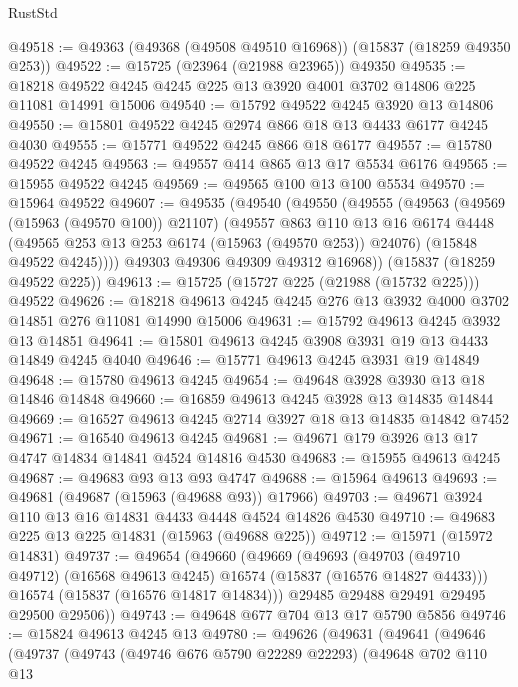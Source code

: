 \begin{lexlean}{RustStd}
\begin{coremodule}
@49518 := @49363 (@49368 (@49508 @49510 @16968)) (@15837 (@18259 @49350 @253))
@49522 := @15725 (@23964 (@21988 @23965)) @49350
@49535 := @18218 @49522 @4245 @4245 @225 @13 @3920 @4001 @3702 @14806 @225 @11081 @14991 @15006
@49540 := @15792 @49522 @4245 @3920 @13 @14806
@49550 := @15801 @49522 @4245 @2974 @866 @18 @13 @4433 @6177 @4245 @4030
@49555 := @15771 @49522 @4245 @866 @18 @6177
@49557 := @15780 @49522 @4245
@49563 := @49557 @414 @865 @13 @17 @5534 @6176
@49565 := @15955 @49522 @4245
@49569 := @49565 @100 @13 @100 @5534
@49570 := @15964 @49522
@49607 := @49535
    (@49540
      (@49550
        (@49555
          (@49563
            (@49569 (@15963 (@49570 @100)) @21107)
            (@49557
              @863
              @110
              @13
              @16
              @6174
              @4448
              (@49565 @253 @13 @253 @6174 (@15963 (@49570 @253)) @24076)
              (@15848 @49522 @4245))))
        @49303
        @49306
        @49309
        @49312
        @16968))
    (@15837 (@18259 @49522 @225))
@49613 := @15725 (@15727 @225 (@21988 (@15732 @225))) @49522
@49626 := @18218 @49613 @4245 @4245 @276 @13 @3932 @4000 @3702 @14851 @276 @11081 @14990 @15006
@49631 := @15792 @49613 @4245 @3932 @13 @14851
@49641 := @15801 @49613 @4245 @3908 @3931 @19 @13 @4433 @14849 @4245 @4040
@49646 := @15771 @49613 @4245 @3931 @19 @14849
@49648 := @15780 @49613 @4245
@49654 := @49648 @3928 @3930 @13 @18 @14846 @14848
@49660 := @16859 @49613 @4245 @3928 @13 @14835 @14844
@49669 := @16527 @49613 @4245 @2714 @3927 @18 @13 @14835 @14842 @7452
@49671 := @16540 @49613 @4245
@49681 := @49671 @179 @3926 @13 @17 @4747 @14834 @14841 @4524 @14816 @4530
@49683 := @15955 @49613 @4245
@49687 := @49683 @93 @13 @93 @4747
@49688 := @15964 @49613
@49693 := @49681 (@49687 (@15963 (@49688 @93)) @17966)
@49703 := @49671 @3924 @110 @13 @16 @14831 @4433 @4448 @4524 @14826 @4530
@49710 := @49683 @225 @13 @225 @14831 (@15963 (@49688 @225))
@49712 := @15971 (@15972 @14831)
@49737 := @49654
    (@49660
      (@49669
        (@49693
          (@49703 (@49710 @49712) (@16568 @49613 @4245) @16574 (@15837 (@16576 @14827 @4433)))
          @16574
          (@15837 (@16576 @14817 @14834)))
        @29485
        @29488
        @29491
        @29495
        @29500
        @29506))
@49743 := @49648 @677 @704 @13 @17 @5790 @5856
@49746 := @15824 @49613 @4245 @13
@49780 := @49626
    (@49631
      (@49641
        (@49646
          (@49737
            (@49743
              (@49746 @676 @5790 @22289 @22293)
              (@49648
                @702
                @110
                @13

\end{coremodule}
\end{lexlean}
